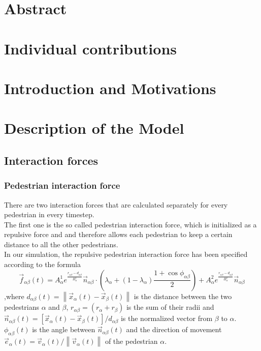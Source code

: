 \documentclass[11pt]{article}
\begin{document}



\section{Abstract}

\section{Individual contributions}

\section{Introduction and Motivations}

\section{Description of the Model}

\subsection{Interaction forces}
\subsubsection{Pedestrian interaction force}
There are two interaction forces that are calculated separately for every pedestrian in every timestep. \\
The first one is the so called pedestrian interaction force, which is initialized as a repulsive force and and therefore allows each pedestrian to keep a certain distance to all the other pedestrians. \\
In our simulation, the repulsive pedestrian interaction force has been specified according to the formula
%
\begin{equation}
\vec{f}_{\alpha\beta}(t) = A_\alpha ^1 e^{\frac{r_{\alpha\beta} -d_{\alpha\beta}}{B_\alpha ^1}}\vec{n}_{\alpha\beta}
\cdot{\left(\lambda _\alpha + (1-\lambda _\alpha)
\frac{1+\cos{\phi_{\alpha\beta}}}{2}\right)}
+ A_\alpha ^2 e^{\frac{r_{\alpha\beta} -d_{\alpha\beta}}{B_\alpha ^2}}\vec{n}_{\alpha\beta}
\end{equation}
%
,where 
\(d_{\alpha\beta}(t)=\left\|\vec{x}_\alpha (t)-\vec{x}_\beta (t)\right\|\)
is the distance between the two pedestrians $\alpha$ and $\beta$, \(r_{\alpha\beta}=(r_\alpha + r_\beta)\) is the sum of their radii and 
\(\vec{n}_{\alpha\beta}(t)=[\vec{x}_\alpha(t)-\vec{x}_\beta(t)]/d_{\alpha\beta}\)
is the normalized vector from $\beta$ to $\alpha$.
\( \phi_{\alpha\beta}(t) \) is the angle between \(\vec{n}_{\alpha\beta}(t)\) and the direction of movement \( \vec{e}_\alpha(t)=\vec{v}_\alpha(t)/\left\|\vec{v}_\alpha(t)\right\| \) of the pedestrian $\alpha$.
\end{document}
